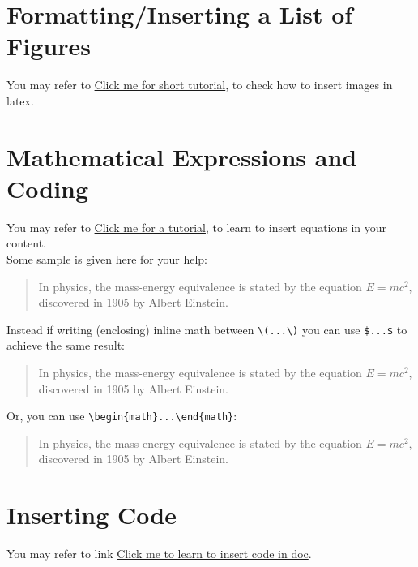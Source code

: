 \documentclass[12pt]{report}
\begin{document}
\section{Formatting/Inserting a List of Figures}
You may refer to \href{https://www.overleaf.com/learn/how-to/How_to_insert_figures_in_Overleaf}{Click me for short tutorial}, to check how to insert images in latex.


\section{Mathematical Expressions and Coding}
You may refer to \href{https://www.overleaf.com/learn/latex/Mathematical_expressions}{Click me for a tutorial}, to learn to insert equations in your content.
\\
Some sample is given here for your help:
\begin{quote}
In physics, the mass-energy equivalence is stated 
by the equation \(E=mc^2\), discovered in 1905 by Albert Einstein.
\end{quote}

\noindent Instead if writing (enclosing) inline math between \verb|\(...\)| you can use \texttt{\$...\$} to achieve the same result:

\begin{quote}
In physics, the mass-energy equivalence is stated 
by the equation $E=mc^2$, discovered in 1905 by Albert Einstein.
\end{quote}

\noindent Or, you can use \verb|\begin{math}...\end{math}|:

\begin{quote}
In physics, the mass-energy equivalence is stated 
by the equation \begin{math}E=mc^2\end{math}, discovered in 1905 by Albert Einstein.
\end{quote}

\section{Inserting Code}
You may refer to link \href{https://www.overleaf.com/learn/latex/Code_listing}{Click me to learn to insert code in doc}.
\end{document}
